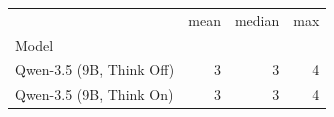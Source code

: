 \begin{tabular}{lrrr}
\toprule
 & mean & median & max \\
Model &  &  &  \\
\midrule
Qwen-3.5 (9B, Think Off) & 3 & 3 & 4 \\
Qwen-3.5 (9B, Think On) & 3 & 3 & 4 \\
\bottomrule
\end{tabular}
